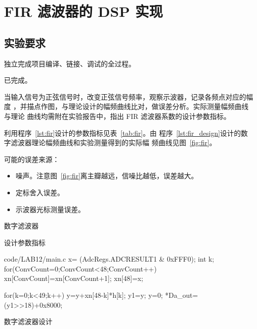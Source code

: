 \documentclass[../main]{subfiles}
\begin{document}
\chapter{FIR 滤波器的 DSP 实现}%
\label{cha:fir}

\section{实验要求}%
\label{sec:\arabic{chapter}requirement}

\begin{Exercise}
  独立完成项目编译、链接、调试的全过程。
\end{Exercise}

\begin{Answer}
  已完成。
\end{Answer}

\begin{Exercise}
  当输入信号为正弦信号时，改变正弦信号频率，观察示波器，记录各频点对应的幅度
  ，并描点作图，与理论设计的幅频曲线比对，做误差分析。实际测量幅频曲线与理论
  曲线均需附在实验报告中，指出 FIR 滤波器系数的设计参数指标。
\end{Exercise}

\begin{Answer}
  利用程序~\ref{lst:fir}设计的参数指标见表~\ref{tab:fir}。由
  程序~\ref{lst:fir_design}设计的数字滤波器理论幅频曲线和实验测量得到的实际幅
  频曲线见图~\ref{fig:fir}。

  可能的误差来源：

  \begin{itemize}
    \item 噪声。注意图~\ref{fig:fir}离主瓣越远，信噪比越低，误差越大。
    \item 定标舍入误差。
    \item 示波器光标测量误差。
  \end{itemize}
\end{Answer}

\begin{listing}[htbp]
  \centering
  \caption{数字滤波器}%
  \label{lst:fir}
\end{listing}

\begin{table}[htbp]
  \centering
  \caption{设计参数指标}%
  \label{tab:fir}
  \tiny
\end{table}

\begin{listing}[htbp]
  \centering
\begin{langPyOne}[matlab][firstnumber = 366]{code/LAB12/main.c}
   x= (AdcRegs.ADCRESULT1 & 0xFFF0);
	 int k;
	 for(ConvCount=0;ConvCount<48;ConvCount++)
      xn[ConvCount]=xn[ConvCount+1];
	 xn[48]=x;

	 for(k=0;k<49;k++)
      y=y+xn[48-k]*h[k];
	 y1=y;
	 y=0;
	 *Da_out=(y1>>18)+0x8000;
\end{langPyOne}
  \caption{数字滤波器设计}%
  \label{lst:fir_design}
\end{listing}
\end{document}
